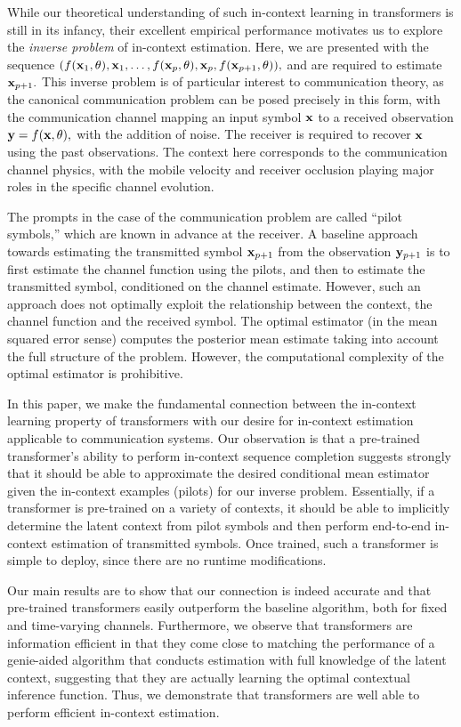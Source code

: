 \documentclass[journal,letterpaper,onecolumn]{IEEEtran}
\begin{document}
While our theoretical understanding of such in-context learning in transformers is still in its infancy, their excellent empirical performance motivates us to explore the \emph{inverse problem} of in-context estimation.  Here, we are presented with the sequence $(f({\mathbf{x}}_1, \theta), {\mathbf{x}}_1,\hdots,  f({\mathbf{x}}_p, \theta), {\mathbf{x}}_p, f({\mathbf{x}}_{p+1}, \theta)),$ and are required to estimate ${\mathbf{x}}_{p+1}.$  This inverse problem is of particular interest to communication theory, as the canonical communication problem can be posed precisely in this form, with the communication channel mapping an input symbol ${\mathbf{x}}$ to a received observation ${\mathbf{y}} = f({\mathbf{x}}, \theta),$  with the addition of noise.  The receiver is required to recover ${\mathbf{x}}$ using the past observations.  The context here corresponds to the communication channel physics, with the mobile velocity and receiver occlusion playing major roles in the specific channel evolution.      

The prompts in the case of the communication problem are called ``pilot symbols,'' which are known in advance at the receiver.  A baseline approach towards estimating the transmitted symbol ${\mathbf{x}}_{p+1}$ from the observation ${\mathbf{y}}_{p+1}$ is to first estimate the channel function using the pilots, and then to estimate the transmitted symbol, conditioned on the channel estimate.  However, such an approach does not optimally exploit the relationship between the context, the channel function and the received symbol.  
The optimal estimator (in the mean squared error sense) computes the posterior mean estimate taking into account the full structure of the problem. However, the computational complexity of the optimal estimator is prohibitive. 

In this paper, we make the fundamental connection between the in-context learning property of transformers with our desire for in-context estimation applicable to communication systems.  Our observation is that a pre-trained transformer's ability to perform in-context sequence completion suggests strongly that it should be able to approximate the desired conditional mean estimator given the in-context examples (pilots) for our inverse problem.  Essentially, if a transformer is pre-trained on a variety of contexts, it should be able to implicitly determine the latent context from pilot symbols and then perform end-to-end in-context estimation of transmitted symbols.  Once trained, such a transformer is simple to deploy, since there are no runtime modifications.

Our main results are to show that our connection is indeed accurate and that pre-trained transformers  easily outperform the baseline algorithm, both for fixed and time-varying channels.  Furthermore, we observe that transformers are information efficient in that they come close to matching the performance of a genie-aided algorithm that conducts estimation with full knowledge of the latent context, suggesting that they are actually learning the optimal contextual inference function.  Thus, we demonstrate that transformers are well able to perform efficient in-context estimation.
\end{document}
